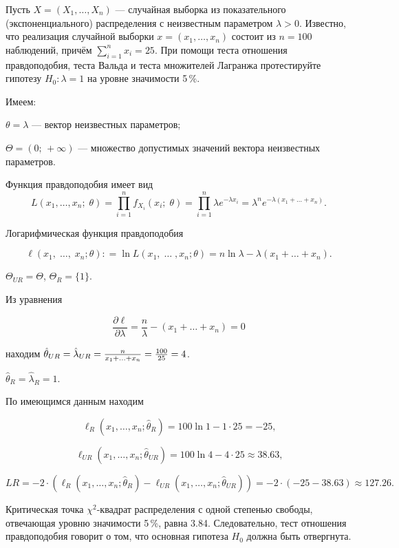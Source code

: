 \begin{problem}
Пусть $X = (X_1, \ldots, X_n)$ — случайная выборка из показательного (экспоненциального) распределения с неизвестным параметром  $\lambda > 0$. Известно, что реализация случайной выборки $x = (x_1, \ldots, x_n)$ состоит из $n = 100$ наблюдений, причём $\sum_{i=1}^{n}x_i = 25$. При помощи теста отношения правдоподобия, теста Вальда и теста множителей Лагранжа протестируйте гипотезу $H_0 \colon \lambda = 1$ на уровне значимости 5\,\%.
\begin{sol}
  Имеем:

$\theta = \lambda$ — вектор неизвестных параметров;

$\Theta = (0; \, + \infty)$ — множество допустимых значений вектора неизвестных параметров.

Функция правдоподобия имеет вид
\[
L({x_1}, \ldots ,{x_n};\;\theta) = \prod\limits_{i = 1}^n {{f_{{X_i}}}({x_i};\;\theta )}  = \prod\limits_{i = 1}^n {\lambda {e^{ - \lambda {x_i}}}}  = {\lambda ^n}{e^{ - \lambda ({x_1} +  \ldots  + {x_n})}} \text{.}
\]

Логарифмическая функция правдоподобия

\[
\ell({x_1},\; \ldots ,\;{x_n};\theta ): = \ln L({x_1},\; \ldots \;,{x_n};\theta ) = n\ln \lambda  - \lambda ({x_1} +  \ldots  + {x_n}) \text{.}
\]


$\Theta_{UR} = \Theta$, $\Theta_{R} = \{1\}$.

Из уравнения

\[\frac{{\partial \ell}}{{\partial \lambda }} = \frac{n}{\lambda } - ({x_1} +  \ldots  + {x_n}) = 0\]

находим ${\hat \theta _{UR}} = {\hat \lambda _{UR}} = {\textstyle{n \over {{x_1} +  \ldots  + {x_n}}}} = {\textstyle{{100} \over {25}}} = 4$.

${\hat \theta _R} = {\hat \lambda _R} = 1$.

По имеющимся данным находим


\[
{\ell_R}({x_1}, \ldots,{x_n};{\hat \theta _R}) = 100\ln 1 - 1 \cdot 25 =  - 25 \text{,}
\]

\[
{\ell_{UR}}({x_1}, \ldots,{x_n};{\hat \theta _{UR}}) = 100\ln 4 - 4 \cdot 25 \approx {{38}}{{.63}} \text{,}
\]

\[
LR =  - 2 \cdot ({\ell_R}({x_1}, \ldots,{x_n};{\hat \theta _R}) - {\ell_{UR}}({x_1}, \ldots,{x_n};{\hat \theta _{UR}})) =  - 2 \cdot ( - 25 - {{38}}{{.63}}) \approx {{127}}{{.26}} \text{.}
\]

Критическая точка $\chi^2$-квадрат распределения с одной степенью свободы, отвечающая уровню значимости 5\,\%, равна 3.84. Следовательно, тест отношения правдоподобия говорит о том, что основная гипотеза $H_0$ должна быть отвергнута.


\end{sol}
\end{problem}
